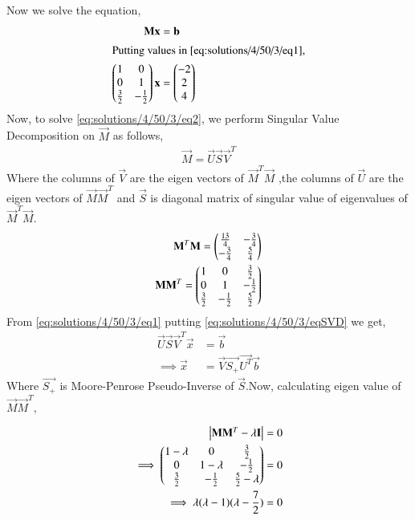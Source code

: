 Now we solve the equation,
\begin{align}
\mathbf{M}\mathbf{x} &= \mathbf{b}\label{eq:solutions/4/50/3/eq1}\\
\intertext{Putting values in \eqref{eq:solutions/4/50/3/eq1},}
\begin{pmatrix}1&0\\0&1\\ \frac{3}{2}& -\frac{1}{2}\end{pmatrix}\mathbf{x} &= \begin{pmatrix}-2\\2\\4\end{pmatrix}\label{eq:solutions/4/50/3/eq2}
\end{align}
Now, to solve \eqref{eq:solutions/4/50/3/eq2}, we perform Singular Value Decomposition on $\vec{M}$ as follows,
\begin{align}
\vec{M}=\vec{U}\vec{S}\vec{V}^T\label{eq:solutions/4/50/3/eqSVD}
\end{align}
Where the columns of $\vec{V}$ are the eigen vectors of $\vec{M}^T\vec{M}$ ,the columns of $\vec{U}$ are the eigen vectors of $\vec{M}\vec{M}^T$ and $\vec{S}$ is diagonal matrix of singular value of eigenvalues of $\vec{M}^T\vec{M}$.
\begin{align}
\mathbf{M}^T\mathbf{M}=\begin{pmatrix}\frac{13}{4}& -\frac{3}{4}\\ -\frac{3}{4}&\frac{5}{4}\end{pmatrix}\label{eq:solutions/4/50/3/eqMTM}\\
\mathbf{M}\mathbf{M}^T=\begin{pmatrix}1&0& \frac{3}{2}\\0&1& -\frac{1}{2}\\ \frac{3}{2}&-\frac{1}{2}& \frac{5}{2}\end{pmatrix}
\end{align}
From \eqref{eq:solutions/4/50/3/eq1} putting \eqref{eq:solutions/4/50/3/eqSVD} we get,
\begin{align}
\vec{U}\vec{S}\vec{V}^T\vec{x} & = \vec{b}\\
\implies\vec{x} &= \vec{V}\vec{S_+}\vec{U^T}\vec{b}\label{eq:solutions/4/50/3/eqX}
\end{align}
Where $\vec{S_+}$ is Moore-Penrose Pseudo-Inverse of $\vec{S}$.Now, calculating eigen value of $\vec{M}\vec{M}^T$,


\begin{align}
\begin{vmatrix}\mathbf{M}\mathbf{M}^T - \lambda\mathbf{I}\end{vmatrix} &= 0\\
\implies\begin{pmatrix}1-\lambda&0& \frac{3}{2} \\0&1-\lambda& -\frac{1}{2}\\   \frac{3}{2}& -\frac{1}{2}&\frac{5}{2}-\lambda\end{pmatrix} &=0\\
\implies\lambda (\lambda - 1)(\lambda - \frac{7}{2}) &=0
\end{align}


